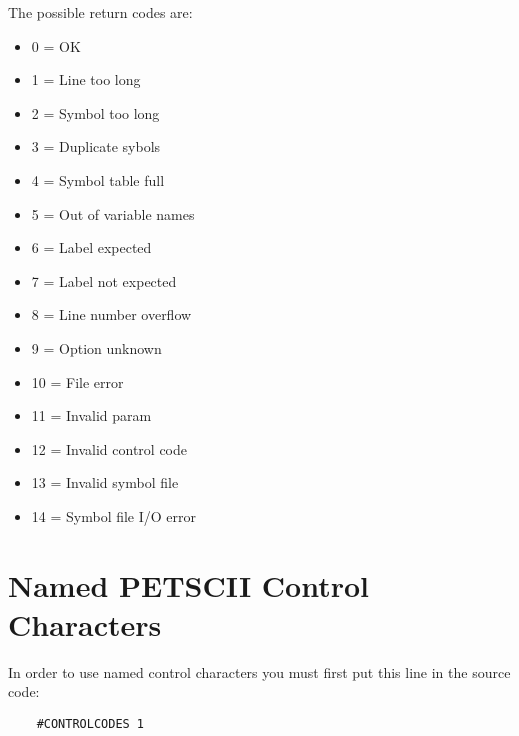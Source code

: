 \documentclass{article}
\begin{document}
        The possible return codes are:

        \begin{itemize}
            \item 0 = OK
            \item 1 = Line too long
            \item 2 = Symbol too long
            \item 3 = Duplicate sybols
            \item 4 = Symbol table full
            \item 5 = Out of variable names
            \item 6 = Label expected
            \item 7 = Label not expected
            \item 8 = Line number overflow
            \item 9 = Option unknown
            \item 10 = File error
            \item 11 = Invalid param
            \item 12 = Invalid control code
            \item 13 = Invalid symbol file
            \item 14 = Symbol file I/O error
        \end{itemize}

\appendix
\newpage
\section{Named PETSCII Control Characters}
    
    In order to use named control characters you must first
    put this line in the source code:

    \begin{verbatim}
    #CONTROLCODES 1
    \end{verbatim}
\end{document}
